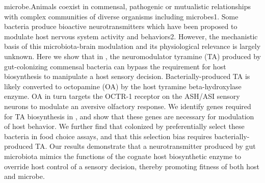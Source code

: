 \documentclass[]{article}
\begin{document}
{{{microbe.}{Animals coexist in commensal, pathogenic or mutualistic relationships with complex communities of diverse organisms including microbes1. Some bacteria produce bioactive neurotransmitters which have been proposed to modulate host nervous system activity and behaviors2. However, the mechanistic basis of this microbiota-brain modulation and its physiological relevance is largely unknown. Here we show that in , the neuromodulator tyramine (TA) produced by gut-colonizing commensal  bacteria can bypass the requirement for host biosynthesis to manipulate a host sensory decision. Bacterially-produced TA is likely converted to octopamine (OA) by the host tyramine beta-hydroxylase enzyme. OA in turn targets the OCTR-1 receptor on the ASH/ASI sensory neurons to modulate an aversive olfactory response. We identify genes required for TA biosynthesis in , and show that these genes are necessary for modulation of host behavior. We further find that  colonized by  preferentially select these bacteria in food choice assays, and that this selection bias requires bacterially-produced TA. Our results demonstrate that a neurotransmitter produced by gut microbiota mimics the functions of the cognate host biosynthetic enzyme to override host control of a sensory decision, thereby promoting fitness of both host and microbe.}}\label{animals-coexist-in-commensal-pathogenic-or-mutualistic-relationships-with-complex-communities-of-diverse-organisms-including-microbes1.-some-bacteria-produce-bioactive-neurotransmitters-which-have-been-proposed-to-modulate-host-nervous-system-activity-and-behaviors2.-however-the-mechanistic-basis-of-this-microbiota-brain-modulation-and-its-physiological-relevance-is-largely-unknown.-here-we-show-that-in-the-neuromodulator-tyramine-ta-produced-by-gut-colonizing-commensal-bacteria-can-bypass-the-requirement-for-host-biosynthesis-to-manipulate-a-host-sensory-decision.-bacterially-produced-ta-is-likely-converted-to-octopamine-oa-by-the-host-tyramine-beta-hydroxylase-enzyme.-oa-in-turn-targets-the-octr-1-receptor-on-the-ashasi-sensory-neurons-to-modulate-an-aversive-olfactory-response.-we-identify-genes-required-for-ta-biosynthesis-in-and-show-that-these-genes-are-necessary-for-modulation-of-host-behavior.-we-further-find-that-colonized-by-preferentially-select-these-bacteria-in-food-choice-assays-and-that-this-selection-bias-requires-bacterially-produced-ta.-our-results-demonstrate-that-a-neurotransmitter-produced-by-gut-microbiota-mimics-the-functions-of-the-cognate-host-biosynthetic-enzyme-to-override-host-control-of-a-sensory-decision-thereby-promoting-fitness-of-both-host-and-microbe.}}
\end{document}
